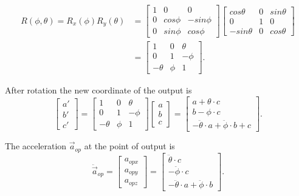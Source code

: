  \begin{equation}
   \begin{split}
     R(\phi,\theta) = R_x(\phi) R_y(\theta) &= \begin{bmatrix}
     1 & 0 & 0\\
     0 & cos\phi & -sin\phi\\
     0 & sin\phi & cos\phi
     \end{bmatrix}
     \begin{bmatrix}
     cos\theta & 0 & sin\theta\\
     0 & 1 & 0\\
     -sin\theta & 0 & cos\theta
     \end{bmatrix}\\
       &=\begin{bmatrix}
     1 & 0 & \theta\\
     0 & 1 & -\phi\\
     -\theta & \phi & 1
     \end{bmatrix}.
   \end{split}
 \end{equation}
 
 After rotation the new coordinate of the output is
 \begin{equation}
     \begin{bmatrix}
     a'\\
     b'\\
     c'
     \end{bmatrix}=
     \begin{bmatrix}
     1 & 0 & \theta\\
     0 & 1 & -\phi\\
     -\theta & \phi & 1
     \end{bmatrix}
     \begin{bmatrix}
     a\\
     b\\
     c
     \end{bmatrix}=
     \begin{bmatrix}
     a+\theta\cdot c\\
     b-\phi\cdot c\\
     -\ddot{\theta}\cdot a+\ddot{\phi}\cdot b +c
     \end{bmatrix}.
 \end{equation}
 
 The acceleration $\vec a_{op}$ at the point of output is
 \begin{equation}
     \ddot{\vec{a}}_{op}=
     \begin{bmatrix}
     a_{opx}\\
     a_{opy}\\
     a_{opz}
     \end{bmatrix}=
     \begin{bmatrix}
     \ddot{\theta}\cdot c\\
     -\ddot{\phi}\cdot c\\
     -\ddot{\theta}\cdot a+\ddot{\phi}\cdot b
     \end{bmatrix}.
 \end{equation}
 
